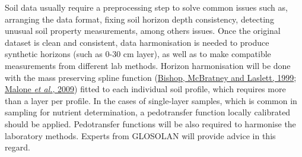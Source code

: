 \documentclass[
  10pt,
  b5paper,
  oneside]{book}
\begin{document}
\begin{table}[htbp]
    \caption{Format example of a soil dataset}
\end{table}

Soil data usually require a preprocessing step to solve common issues such as, arranging the data format, fixing soil horizon depth consistency, detecting unusual soil property measurements, among others issues.
Once the original dataset is clean and consistent, data harmonisation is needed to produce synthetic horizons (such as 0-30 cm layer), as well as to make compatible measurements from different lab methods. Horizon harmonisation will be done with the mass preserving spline function (\protect\hyperlink{ref-Bishop1999}{Bishop, McBratney and Laslett, 1999}; \protect\hyperlink{ref-Malone2009}{Malone \emph{et al.}, 2009}) fitted to each individual soil profile, which requires more than a layer per profile. In the cases of single-layer samples, which is common in sampling for nutrient determination, a pedotransfer function locally calibrated should be applied. Pedotransfer functions will be also required to harmonise the laboratory methods. Experts from GLOSOLAN will provide advice in this regard.
\end{document}

